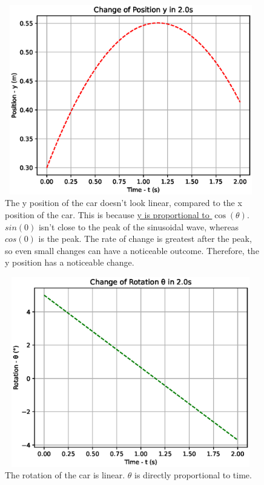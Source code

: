 \documentclass[10pt]{article}
\begin{document}
\begin{figure}
\centering
\includegraphics[width=11cm, height=8.25cm]{q1_y_t.eps}
\caption
{The y position of the car doesn’t look linear, compared to the x position of the car. This is because \hyperref[3:y_prop]{y is proportional to $\cos(\theta)$}. $sin(0)$ isn’t close to the peak of the sinusoidal wave, whereas $cos(0)$ is the peak. The rate of change is greatest after the peak, so even small changes can have a noticeable outcome. Therefore, the y position has a noticeable change.}
\end{figure}

\newpage
\begin{figure}
\centering
\includegraphics[width=11cm, height=8.25cm]{q1_theta_t.eps}
\caption
{The rotation of the car is linear. $\theta$ is directly proportional to time.}
\end{figure}
\end{document}
